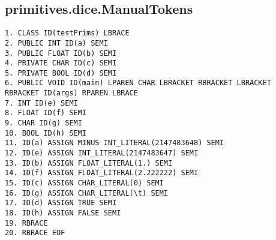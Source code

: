 \subsection{primitives.dice.ManualTokens}
\begin{verbatim}
1. CLASS ID(testPrims) LBRACE
2. PUBLIC INT ID(a) SEMI
3. PUBLIC FLOAT ID(b) SEMI
4. PRIVATE CHAR ID(c) SEMI
5. PRIVATE BOOL ID(d) SEMI
6. PUBLIC VOID ID(main) LPAREN CHAR LBRACKET RBRACKET LBRACKET RBRACKET ID(args) RPAREN LBRACE
7. INT ID(e) SEMI
8. FLOAT ID(f) SEMI
9. CHAR ID(g) SEMI
10. BOOL ID(h) SEMI
11. ID(a) ASSIGN MINUS INT_LITERAL(2147483648) SEMI
12. ID(e) ASSIGN INT_LITERAL(2147483647) SEMI
13. ID(b) ASSIGN FLOAT_LITERAL(1.) SEMI
14. ID(f) ASSIGN FLOAT_LITERAL(2.222222) SEMI
15. ID(c) ASSIGN CHAR_LITERAL(0) SEMI
16. ID(g) ASSIGN CHAR_LITERAL(\t) SEMI
17. ID(d) ASSIGN TRUE SEMI
18. ID(h) ASSIGN FALSE SEMI
19. RBRACE
20. RBRACE EOF

\end{verbatim}